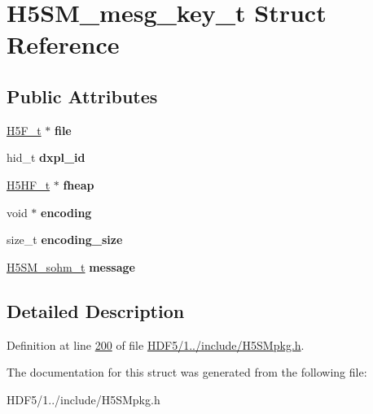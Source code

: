 \hypertarget{struct_h5_s_m__mesg__key__t}{}\section{H5\+S\+M\+\_\+mesg\+\_\+key\+\_\+t Struct Reference}
\label{struct_h5_s_m__mesg__key__t}
\subsection*{Public Attributes}
\begin{DoxyCompactItemize}
\item 
\mbox{\label{struct_h5_s_m__mesg__key__t_a3d0f21ede7e658a3f2e2924e42448332}} 
\hyperlink{struct_h5_f__t}{H5\+F\+\_\+t} $\ast$ {\bfseries file}
\item 
\mbox{\label{struct_h5_s_m__mesg__key__t_a29022bfaf017b35c1c2128ad747cb1f3}} 
hid\+\_\+t {\bfseries dxpl\+\_\+id}
\item 
\mbox{\label{struct_h5_s_m__mesg__key__t_a3798cd1c2f5ca2407a4e3b84ddbcd26f}} 
\hyperlink{struct_h5_h_f__t}{H5\+H\+F\+\_\+t} $\ast$ {\bfseries fheap}
\item 
\mbox{\label{struct_h5_s_m__mesg__key__t_a65c875a6b2269f298206cff044e67b34}} 
void $\ast$ {\bfseries encoding}
\item 
\mbox{\label{struct_h5_s_m__mesg__key__t_a5bbb34b0ceca255f58093b41525e3b25}} 
size\+\_\+t {\bfseries encoding\+\_\+size}
\item 
\mbox{\label{struct_h5_s_m__mesg__key__t_acbce867514bec5821cb833ab80df8ddf}} 
\hyperlink{struct_h5_s_m__sohm__t}{H5\+S\+M\+\_\+sohm\+\_\+t} {\bfseries message}
\end{DoxyCompactItemize}


\subsection{Detailed Description}


Definition at line \hyperlink{_h_d_f5_21_810_81_2include_2_h5_s_mpkg_8h_source_l00200}{200} of file \hyperlink{_h_d_f5_21_810_81_2include_2_h5_s_mpkg_8h_source}{H\+D\+F5/1../include/\+H5\+S\+Mpkg.\+h}.



The documentation for this struct was generated from the following file\+:\begin{DoxyCompactItemize}
\item 
H\+D\+F5/1../include/\+H5\+S\+Mpkg.\+h\end{DoxyCompactItemize}
